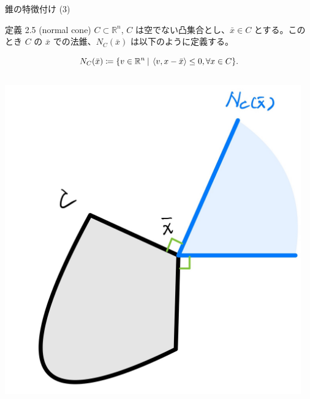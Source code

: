 \documentclass[aspectratio=169, dvipdfmx, 11pt]{beamer} %
\begin{document}
\begin{frame}{錐の特徴付け (3)}
  \begin{block}{定義 2.5 (normal cone) }
    $C \subset \mathbb{R}^n$, $C$ は空でない凸集合とし、$\bar{x} \in C$ とする。このとき $C$ の $\bar{x}$ での法錐、$N_C(\bar{x})$ は以下のように定義する。

    \begin{equation}
      N_C(\bar{x}) \coloneqq \{ v \in \mathbb{R}^n \:|\: \left\langle v, x - \bar{x} \right\rangle \leq 0, \forall x \in C \}. \notag
    \end{equation}

  \end{block}

  \centering
  \begin{columns}
    \begin{column}{0.48\textwidth}
      \includegraphics[keepaspectratio, scale=0.06]{figures/normal_cone_1.jpg}
    \end{column}
    \begin{column}{0.48\textwidth}

\end{column}
\end{columns}
\end{frame}
\end{document}
